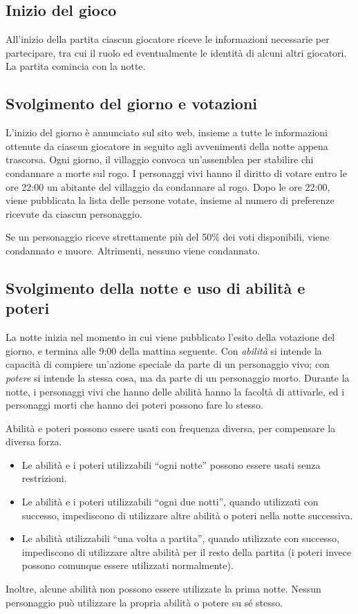 \documentclass[a4paper,10pt]{article}
\begin{document}
\subsection{Inizio del gioco}

All'inizio della partita ciascun giocatore riceve le informazioni necessarie per partecipare, tra cui il ruolo ed eventualmente le identità di alcuni altri giocatori. La partita comincia con la notte.


\subsection{Svolgimento del giorno e votazioni}

L'inizio del giorno è annunciato sul sito web, insieme a tutte le informazioni ottenute da ciascun giocatore in seguito agli avvenimenti della notte appena trascorsa. Ogni giorno, il villaggio convoca un'assemblea per stabilire chi condannare a morte sul rogo. I personaggi vivi hanno il diritto di votare entro le ore 22:00 un abitante del villaggio da condannare al rogo. Dopo le ore 22:00, viene pubblicata la lista delle persone votate, insieme al numero di preferenze ricevute da ciascun personaggio.

Se un personaggio riceve strettamente più del 50\% dei voti disponibili, viene condannato e muore. Altrimenti, nessuno viene condannato.

\subsection{Svolgimento della notte e uso di abilità e poteri}

La notte inizia nel momento in cui viene pubblicato l'esito della votazione del giorno, e termina alle 9:00 della mattina seguente. Con \emph{abilità} si intende la capacità di compiere un'azione speciale da parte di un personaggio vivo; con \emph{potere} si intende la stessa cosa, ma da parte di un personaggio morto. Durante la notte, i personaggi vivi che hanno delle abilità hanno la facoltà di attivarle, ed i personaggi morti che hanno dei poteri possono fare lo stesso.

Abilità e poteri possono essere usati con frequenza diversa, per compensare la diversa forza.
\begin{itemize}
	\item Le abilità e i poteri utilizzabili ``ogni notte'' possono essere usati senza restrizioni.
	\item Le abilità e i poteri utilizzabili ``ogni due notti'', quando utilizzati con successo, impediscono di utilizzare altre abilità o poteri nella notte successiva.
	\item Le abilità utilizzabili ``una volta a partita'', quando utilizzate con successo, impediscono di utilizzare altre abilità per il resto della partita (i poteri invece possono comunque essere utilizzati normalmente).
\end{itemize}
Inoltre, alcune abilità non possono essere utilizzate la prima notte. Nessun personaggio può utilizzare la propria abilità o potere su sé stesso.
\end{document}

